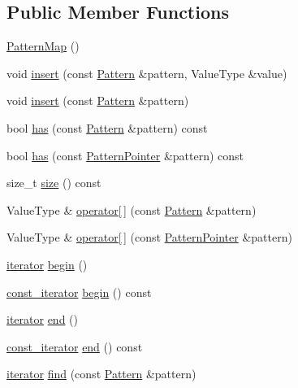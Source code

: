 \subsection*{Public Member Functions}
\begin{DoxyCompactItemize}
\item 
\hyperlink{classPatternMap_af59f2ae4994cc927580751644b00bef0}{Pattern\+Map} ()
\item 
void \hyperlink{classPatternMap_a67628e669cf2995a44769cda83bf8e85}{insert} (const \hyperlink{classPattern}{Pattern} \&pattern, Value\+Type \&value)
\item 
void \hyperlink{classPatternMap_a911511a1b32cef2ee3efb234f66974ce}{insert} (const \hyperlink{classPattern}{Pattern} \&pattern)
\item 
bool \hyperlink{classPatternMap_a038d49e8aed58a207c3e106b086cdab0}{has} (const \hyperlink{classPattern}{Pattern} \&pattern) const 
\item 
bool \hyperlink{classPatternMap_a18587e4b3c6143749b4b96e8f4808cdb}{has} (const \hyperlink{classPatternPointer}{Pattern\+Pointer} \&pattern) const 
\item 
size\+\_\+t \hyperlink{classPatternMap_aed30070f31256d0c1335fa9bd3b5db1c}{size} () const 
\item 
Value\+Type \& \hyperlink{classPatternMap_af08cad16a81aede5cf12f9601b75d697}{operator\mbox{[}$\,$\mbox{]}} (const \hyperlink{classPattern}{Pattern} \&pattern)
\item 
Value\+Type \& \hyperlink{classPatternMap_a790d9a4673f3971c644b120660bfab22}{operator\mbox{[}$\,$\mbox{]}} (const \hyperlink{classPatternPointer}{Pattern\+Pointer} \&pattern)
\item 
\hyperlink{classPatternMap_a4de5ceaff3526d091098b4d82dde2b27}{iterator} \hyperlink{classPatternMap_a6e536f5947c4e1752f91166922c4ae16}{begin} ()
\item 
\hyperlink{classPatternMap_aba8ff62eadadedc25bf4ea799a322cf3}{const\+\_\+iterator} \hyperlink{classPatternMap_addb90b8e3f3721f061757bb5cec64bf2}{begin} () const 
\item 
\hyperlink{classPatternMap_a4de5ceaff3526d091098b4d82dde2b27}{iterator} \hyperlink{classPatternMap_aa5a92eab727e74e54b93f7f7916e26cb}{end} ()
\item 
\hyperlink{classPatternMap_aba8ff62eadadedc25bf4ea799a322cf3}{const\+\_\+iterator} \hyperlink{classPatternMap_a75f67f68fb66a7d15d7f8c75cb08dc8d}{end} () const 
\item 
\hyperlink{classPatternMap_a4de5ceaff3526d091098b4d82dde2b27}{iterator} \hyperlink{classPatternMap_a4f36d73514e80d18f93395a72f81e6bc}{find} (const \hyperlink{classPattern}{Pattern} \&pattern)

\end{DoxyCompactItemize}
